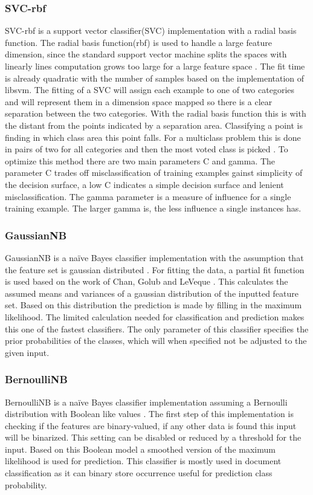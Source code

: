 \documentclass[a4paper,10pt]{article}
\begin{document}
\subsubsection{SVC-rbf}
SVC-rbf is a support vector classifier(SVC) implementation with a radial basis function. The radial basis function(rbf) is used to handle a large feature dimension, since the standard support vector machine splits the spaces with linearly lines computation grows too large for a large feature space \cite{SVN}. The fit time is already quadratic with the number of samples based on the implementation of libsvm\cite{SVM}. The fitting of a SVC will assign each example to one of two categories and will represent them in a dimension space mapped so there is a clear separation between the two categories. With the radial basis function this is with the distant from the points indicated by a separation area. Classifying a point is finding in which class area this point falls. For a multiclass problem this is done in pairs of two for all categories and then the most voted class is picked \cite{Multi-pair-coup}. To optimize this method there are two main parameters C and gamma. The parameter C trades off misclassification of training examples gainst simplicity of the decision surface, a low C indicates a simple decision surface and lenient misclassification. The gamma parameter is a measure of influence for a single training example. The larger gamma is, the less influence a single instances has.

\subsubsection{GaussianNB}
GaussianNB is a naïve Bayes classifier implementation with the  assumption that the feature set is gaussian distributed \cite{Bayes}. For fitting the data, a partial fit function is used based on the work of Chan, Golub and LeVeque \cite{Sam-var}. This calculates the assumed means and variances of a gaussian distribution of the inputted feature set. Based on this distribution the prediction is made by filling in the maximum likelihood. The limited calculation needed for classification and prediction makes this one of the fastest classifiers. The only parameter of this classifier specifies the prior probabilities of the classes, which will when specified not be adjusted to the given input. 

\subsubsection{BernoulliNB}
BernoulliNB is a naïve Bayes classifier implementation assuming a Bernoulli distribution with Boolean like values \cite{NB-text}. The first step of this implementation is checking if the features are binary-valued, if any other data is found this input will be binarized. This setting can be disabled or reduced by a threshold for the input. Based on this Boolean model a smoothed version of the maximum likelihood is used for prediction. This classifier is mostly used in document classification as it can binary store occurrence useful for prediction class probability.
\end{document}
